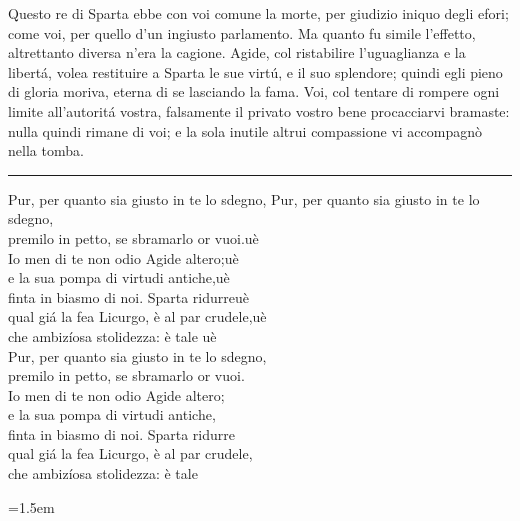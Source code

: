 \documentclass[a5paper,11pt]{book}
\def\testodicontrollo{%
Questo re di Sparta ebbe con voi comune la morte, per giudizio
iniquo degli efori; come voi, per quello d'un ingiusto parlamento.
Ma quanto fu simile l'effetto, altrettanto diversa n'era la
cagione. Agide, col ristabilire l'uguaglianza e la libertá, volea
restituire a Sparta le sue virtú, e il suo splendore; quindi egli
pieno di gloria moriva, eterna di se lasciando la fama. Voi, col
tentare di rompere ogni limite all'autoritá vostra, falsamente il
privato vostro bene procacciarvi bramaste: nulla quindi rimane di
voi; e la sola inutile altrui compassione vi accompagnò nella
tomba.
}
\begin{document}
\shorthandoff{>}
\actname

\testodicontrollo

\noindent\rule{\leftmargini}{1pt}

\begin{versedrama}
  Pur, per quanto sia giusto in te lo sdegno, Pur, per quanto sia giusto in te lo sdegno,\\
  premilo in petto, se sbramarlo or vuoi.uè\\
  Io men di te non odio Agide altero;uè\\
  e la sua pompa di virtudi antiche,uè\\
  finta in biasmo di noi. Sparta ridurreuè\\
  qual giá la fea Licurgo, è al par crudele,uè\\
  che ambizíosa stolidezza: è tale\hspace{0pt plus 1filll} uè\\
  Pur, per quanto sia giusto in te lo sdegno,\\
  premilo in petto, se sbramarlo or vuoi.\\
  Io men di te non odio Agide altero;\\
  e la sua pompa di virtudi antiche,\\
  finta in biasmo di noi. Sparta ridurre\\
  qual giá la fea Licurgo, è al par crudele,\\
  che ambizíosa stolidezza: è tale\\
\end{versedrama}

\leftmargini=1.5em
\end{document}
